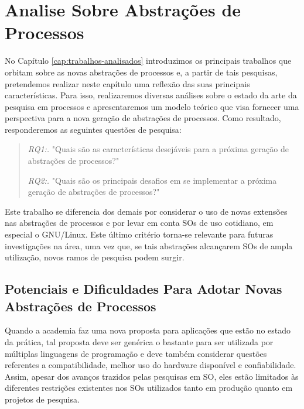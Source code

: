 \chapter{Analise Sobre Abstrações de Processos}
\label{cap:analise-sobre-abstracoes-de-processos}

No Capítulo \ref{cap:trabalhos-analisados} introduzimos os principais trabalhos
que orbitam sobre as novas abstrações de processos e, a partir de tais
pesquisas, pretendemos realizar neste capítulo uma reflexão das suas principais
características. Para isso, realizaremos diversas análises sobre o estado da arte
da pesquisa em processos e apresentaremos um modelo teórico que visa fornecer
uma perspectiva para a nova geração de abstrações de processos. Como resultado,
responderemos as seguintes questões de pesquisa:

\begin{quote}
 \item \textit{RQ1:.} "Quais são as características desejáveis para a próxima geração de abstrações de processos?"
 \item \textit{RQ2:.} "Quais são os principais desafios em se implementar a próxima geração de abstrações de processos?"
\end{quote}

Este trabalho se diferencia dos demais por considerar o uso de novas extensões
nas abstrações de processos e por levar em conta SOs de uso cotidiano, em
especial o GNU/Linux. Este último critério torna-se relevante para futuras
investigações na área, uma vez que, se tais abstrações alcançarem SOs de ampla
utilização, novos ramos de pesquisa podem surgir.

\section{Potenciais e Dificuldades Para Adotar Novas Abstrações de Processos}
\label{sec:potenciais}

Quando a academia faz uma nova proposta para aplicações que estão no estado da
prática, tal proposta deve ser genérica o bastante para ser utilizada por
múltiplas linguagens de programação e deve também considerar questões
referentes a compatibilidade, melhor uso do hardware disponível e
confiabilidade. Assim, apesar dos avanços trazidos pelas pesquisas em SO, eles
estão limitados às diferentes restrições existentes nos SOs utilizados tanto em
produção quanto em projetos de pesquisa.

